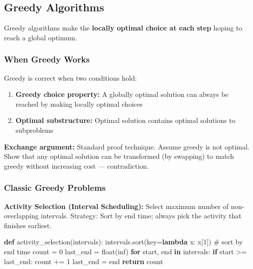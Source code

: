 \documentclass[11pt]{article}
\providecommand{\tightlist}{\setlength{\itemsep}{1pt}\setlength{\parskip}{0pt}}
\newenvironment{Shaded}{\begin{snugshade}}{\end{snugshade}}
\newcommand{\BuiltInTok}[1]{\textcolor[rgb]{0.50,0.55,0.55}{#1}}
\newcommand{\CommentTok}[1]{\textcolor[rgb]{0.48,0.49,0.49}{#1}}
\newcommand{\ControlFlowTok}[1]{\textcolor[rgb]{0.99,0.74,0.29}{\textbf{#1}}}
\newcommand{\DecValTok}[1]{\textcolor[rgb]{0.96,0.45,0.00}{#1}}
\newcommand{\KeywordTok}[1]{\textcolor[rgb]{0.81,0.81,0.76}{\textbf{#1}}}
\newcommand{\NormalTok}[1]{\textcolor[rgb]{0.81,0.81,0.76}{#1}}
\newcommand{\OperatorTok}[1]{\textcolor[rgb]{0.81,0.81,0.76}{#1}}
\newcommand{\StringTok}[1]{\textcolor[rgb]{0.96,0.31,0.31}{#1}}
\begin{document}
\subsection{Greedy Algorithms}\label{greedy-algorithms}

Greedy algorithms make the \textbf{locally optimal choice at each step} hoping to reach a global optimum.

\subsubsection{When Greedy Works}\label{when-greedy-works}

Greedy is correct when two conditions hold:

\begin{enumerate}
\def\labelenumi{\arabic{enumi}.}
\tightlist
\item
  \textbf{Greedy choice property:} A globally optimal solution can always be reached by making locally optimal choices
\item
  \textbf{Optimal substructure:} Optimal solution contains optimal solutions to subproblems
\end{enumerate}

\textbf{Exchange argument:} Standard proof technique. Assume greedy is not optimal. Show that any optimal solution can be transformed (by swapping) to match greedy without increasing cost --- contradiction.

\subsubsection{Classic Greedy Problems}\label{classic-greedy-problems}

\textbf{Activity Selection (Interval Scheduling):}
Select maximum number of non-overlapping intervals.
Strategy: Sort by end time; always pick the activity that finishes earliest.


\begin{Shaded}
\begin{Highlighting}[]
\KeywordTok{def}\NormalTok{ activity\_selection(intervals):}
\NormalTok{    intervals.sort(key}\OperatorTok{=}\KeywordTok{lambda}\NormalTok{ x: x[}\DecValTok{1}\NormalTok{])   }\CommentTok{\# sort by end time}
\NormalTok{    count }\OperatorTok{=} \DecValTok{0}
\NormalTok{    last\_end }\OperatorTok{=} \BuiltInTok{float}\NormalTok{(}\StringTok{\textquotesingle{}{-}inf\textquotesingle{}}\NormalTok{)}
    \ControlFlowTok{for}\NormalTok{ start, end }\KeywordTok{in}\NormalTok{ intervals:}
        \ControlFlowTok{if}\NormalTok{ start }\OperatorTok{\textgreater{}=}\NormalTok{ last\_end:}
\NormalTok{            count }\OperatorTok{+=} \DecValTok{1}
\NormalTok{            last\_end }\OperatorTok{=}\NormalTok{ end}
    \ControlFlowTok{return}\NormalTok{ count}
\end{Highlighting}
\end{Shaded}
\end{document}
